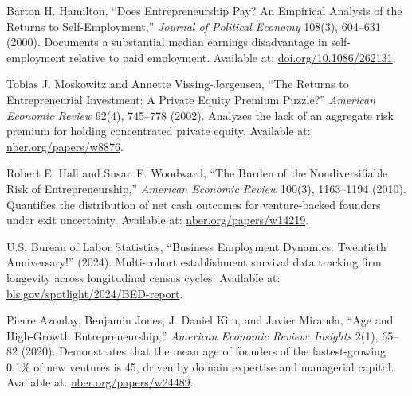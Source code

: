 \begin{enumerate}[label={[\arabic*]},leftmargin=14pt,itemsep=3pt,topsep=2pt,parsep=0pt]
  \item Barton H. Hamilton, ``Does Entrepreneurship Pay? An Empirical Analysis of the Returns to Self-Employment,'' \textit{Journal of Political Economy} 108(3), 604--631 (2000). Documents a substantial median earnings disadvantage in self-employment relative to paid employment. Available at: \href{https://doi.org/10.1086/262131}{doi.org/10.1086/262131}.
  \item Tobias J. Moskowitz and Annette Vissing-J\o{}rgensen, ``The Returns to Entrepreneurial Investment: A Private Equity Premium Puzzle?'' \textit{American Economic Review} 92(4), 745--778 (2002). Analyzes the lack of an aggregate risk premium for holding concentrated private equity. Available at: \href{https://www.nber.org/papers/w8876}{nber.org/papers/w8876}.
  \item Robert E. Hall and Susan E. Woodward, ``The Burden of the Nondiversifiable Risk of Entrepreneurship,'' \textit{American Economic Review} 100(3), 1163--1194 (2010). Quantifies the distribution of net cash outcomes for venture-backed founders under exit uncertainty. Available at: \href{https://www.nber.org/papers/w14219}{nber.org/papers/w14219}.
  \item U.S. Bureau of Labor Statistics, ``Business Employment Dynamics: Twentieth Anniversary!'' (2024). Multi-cohort establishment survival data tracking firm longevity across longitudinal census cycles. Available at: \href{https://www.bls.gov/spotlight/2024/business-employment-dynamics-twentieth-anniversary/}{bls.gov/spotlight/2024/BED-report}.
  \item Pierre Azoulay, Benjamin Jones, J. Daniel Kim, and Javier Miranda, ``Age and High-Growth Entrepreneurship,'' \textit{American Economic Review: Insights} 2(1), 65--82 (2020). Demonstrates that the mean age of founders of the fastest-growing 0.1\% of new ventures is 45, driven by domain expertise and managerial capital. Available at: \href{https://www.nber.org/papers/w24489}{nber.org/papers/w24489}.
\end{enumerate}
